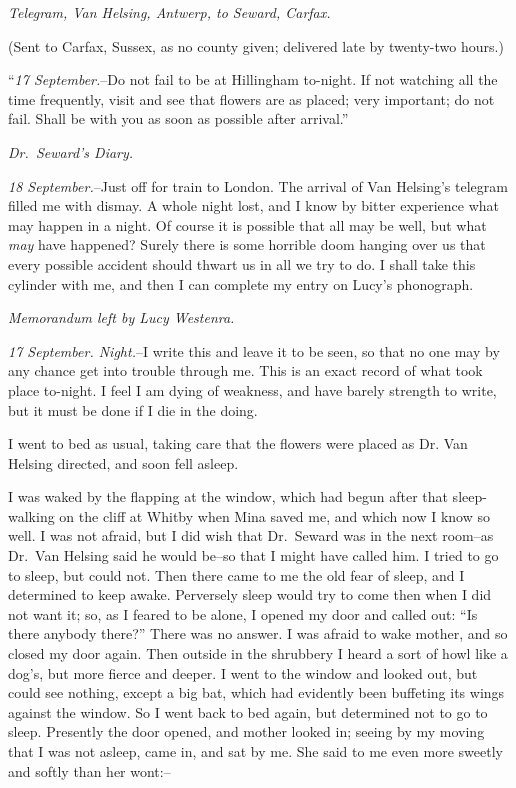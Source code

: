 \documentclass[12pt,openright]{book}
\begin{document}
\textit{Telegram, Van Helsing, Antwerp, to Seward, Carfax.}

(Sent to Carfax, Sussex, as no county given; delivered late by twenty-two hours.)

“\textit{17 September.}–Do not fail to be at Hillingham to-night. If not watching all the time frequently, visit and see that flowers are as placed; very important; do not fail. Shall be with you as soon as possible after arrival.”

\textit{Dr. Seward’s Diary.}

\textit{18 September.}–Just off for train to London. The arrival of Van Helsing’s telegram filled me with dismay. A whole night lost, and I know by bitter experience what may happen in a night. Of course it is possible that all may be well, but what \textit{may} have happened? Surely there is some horrible doom hanging over us that every possible accident should thwart us in all we try to do. I shall take this cylinder with me, and then I can complete my entry on Lucy’s phonograph.

\textit{Memorandum left by Lucy Westenra.}

\textit{17 September. Night.}–I write this and leave it to be seen, so that no one may by any chance get into trouble through me. This is an exact record of what took place to-night. I feel I am dying of weakness, and have barely strength to write, but it must be done if I die in the doing.

I went to bed as usual, taking care that the flowers were placed as Dr. Van Helsing directed, and soon fell asleep.

I was waked by the flapping at the window, which had begun after that sleep-walking on the cliff at Whitby when Mina saved me, and which now I know so well. I was not afraid, but I did wish that Dr. Seward was in the next room–as Dr. Van Helsing said he would be–so that I might have called him. I tried to go to sleep, but could not. Then there came to me the old fear of sleep, and I determined to keep awake. Perversely sleep would try to come then when I did not want it; so, as I feared to be alone, I opened my door and called out: “Is there anybody there?” There was no answer. I was afraid to wake mother, and so closed my door again. Then outside in the shrubbery I heard a sort of howl like a dog’s, but more fierce and deeper. I went to the window and looked out, but could see nothing, except a big bat, which had evidently been buffeting its wings against the window. So I went back to bed again, but determined not to go to sleep. Presently the door opened, and mother looked in; seeing by my moving that I was not asleep, came in, and sat by me. She said to me even more sweetly and softly than her wont:–
\end{document}
